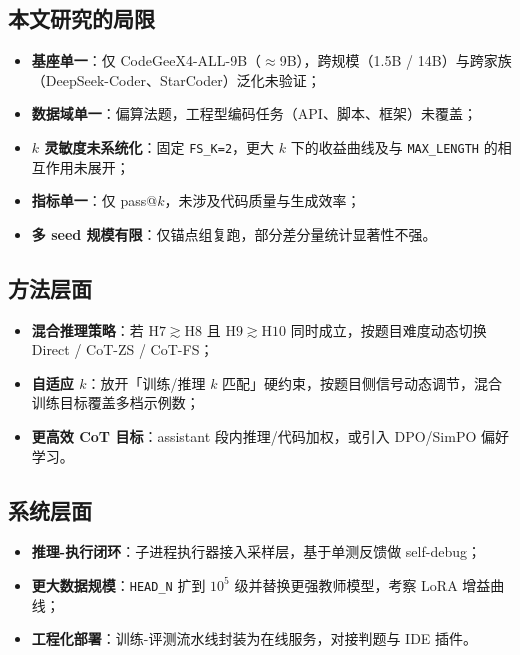 
\subsection{本文研究的局限}
\begin{itemize}
    \item \textbf{基座单一}：仅 CodeGeeX4-ALL-9B（$\approx$9B），跨规模（1.5B / 14B）与跨家族（DeepSeek-Coder、StarCoder）泛化未验证；
    \item \textbf{数据域单一}：偏算法题，工程型编码任务（API、脚本、框架）未覆盖；
    \item \textbf{$k$ 灵敏度未系统化}：固定 \texttt{FS\_K=2}，更大 $k$ 下的收益曲线及与 \texttt{MAX\_LENGTH} 的相互作用未展开；
    \item \textbf{指标单一}：仅 pass@$k$，未涉及代码质量与生成效率；
    \item \textbf{多 seed 规模有限}：仅锚点组复跑，部分差分量统计显著性不强。
\end{itemize}

\subsection{方法层面}
\begin{itemize}
    \item \textbf{混合推理策略}：若 $\mathrm{H7} \gtrsim \mathrm{H8}$ 且 $\mathrm{H9} \gtrsim \mathrm{H10}$ 同时成立，按题目难度动态切换 Direct / CoT-ZS / CoT-FS；
    \item \textbf{自适应 $k$}：放开「训练/推理 $k$ 匹配」硬约束，按题目侧信号动态调节，混合训练目标覆盖多档示例数；
    \item \textbf{更高效 CoT 目标}：assistant 段内推理/代码加权，或引入 DPO/SimPO 偏好学习。
\end{itemize}

\subsection{系统层面}
\begin{itemize}
    \item \textbf{推理-执行闭环}：子进程执行器接入采样层，基于单测反馈做 self-debug；
    \item \textbf{更大数据规模}：\texttt{HEAD\_N} 扩到 $10^5$ 级并替换更强教师模型，考察 LoRA 增益曲线；
    \item \textbf{工程化部署}：训练-评测流水线封装为在线服务，对接判题与 IDE 插件。
\end{itemize}

